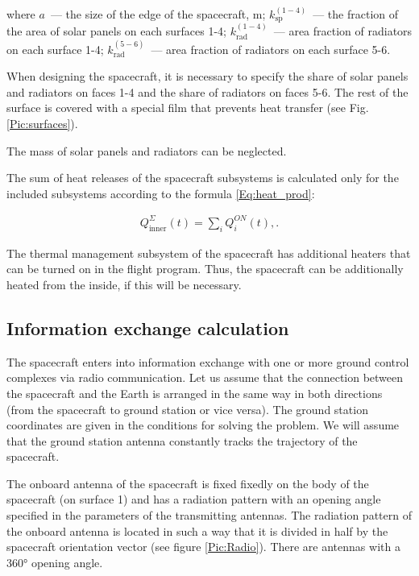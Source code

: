 \documentclass[12pt,a4paper]{article}
\begin{document}
where $a$~--- the size of the edge of the spacecraft, m; $k^{(1-4)}_{\text{sp}}$~--- the fraction of the area of solar panels on each
surfaces 1-4; $k^{(1-4)}_{\text{rad}}$~--- area fraction of radiators on each surface 1-4; $k^{(5-6)}_{\text{rad}}$~--- area fraction of radiators on each surface 5-6.

When designing the spacecraft, it is necessary to specify the share of solar panels and radiators on faces 1-4 and the share of radiators on faces 5-6. The rest of the surface is covered with a special film that prevents heat transfer (see Fig. \ref{Pic:surfaces}).

The mass of solar panels and radiators can be neglected.

The sum of heat releases of the spacecraft subsystems is calculated only for the included subsystems according to the formula
\ref{Eq:heat_prod}:

\begin{eqnarray}
Q^{\Sigma}_{\text{inner}}(t) = \sum_i Q_{i}^{ON}(t), \label{Eq:heat_prod}.
\end{eqnarray}

The thermal management subsystem of the spacecraft has additional heaters that can be turned on in the flight program. Thus, the spacecraft can be additionally heated from the inside, if this
will be necessary.

\subsection{Information exchange calculation}
\label{Sec:Radio}

The spacecraft enters into information exchange with one or more ground control complexes via radio communication. Let us assume that the connection between the spacecraft and the Earth is arranged in the same way in both directions (from the spacecraft to ground station or vice versa). The ground station coordinates are given in the conditions for solving the problem. We will assume that the ground station antenna constantly tracks the trajectory of the spacecraft.

The onboard antenna of the spacecraft is fixed fixedly on the body of the spacecraft (on surface 1) and has a radiation pattern with an opening angle specified in the parameters of the transmitting
antennas. The radiation pattern of the onboard antenna is located in such a way that it is divided in half by the spacecraft orientation vector (see figure \ref{Pic:Radio}). There are antennas with a 360° opening angle.
\end{document}
